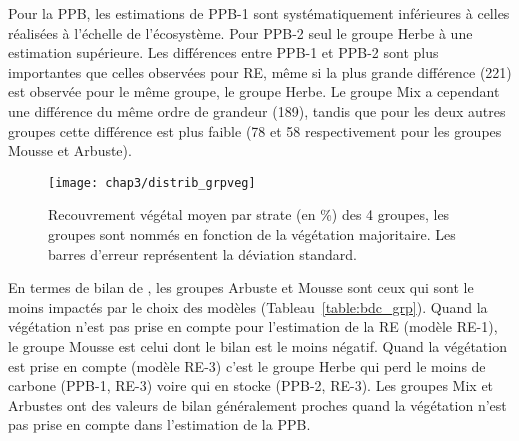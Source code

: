Pour la PPB, les estimations de PPB-1 sont systématiquement inférieures à celles réalisées à l'échelle de l'écosystème.
Pour PPB-2 seul le groupe Herbe à une estimation supérieure.
Les différences entre PPB-1 et PPB-2 sont plus importantes que celles observées pour RE, même si la plus grande différence (\num{221}) est observée pour le même groupe, le groupe Herbe.
Le groupe Mix a cependant une différence du même ordre de grandeur (\num{189}), tandis que pour les deux autres groupes cette différence est plus faible (78 et 58 respectivement pour les groupes Mousse et Arbuste).

\begin{figure}
\centering
\texttt{[image: chap3/distrib\_grpveg]}
\caption{Recouvrement végétal moyen par strate (en \si{\percent}) des 4 groupes, les groupes sont nommés en fonction de la végétation majoritaire. Les barres d'erreur représentent la déviation standard.}
\label{fig:distrib_grpveg}
\end{figure}

En termes de bilan de \coo, les groupes Arbuste et Mousse sont ceux qui sont le moins impactés par le choix des modèles (Tableau~\ref{table:bdc_grp}).
Quand la végétation n'est pas prise en compte pour l'estimation de la RE (modèle RE-1), le groupe Mousse est celui dont le bilan est le moins négatif.
Quand la végétation est prise en compte (modèle RE-3) c'est le groupe Herbe qui perd le moins de carbone (PPB-1, RE-3) voire qui en stocke (PPB-2, RE-3).
Les groupes Mix et Arbustes ont des valeurs de bilan généralement proches quand la végétation n'est pas prise en compte dans l'estimation de la PPB.





